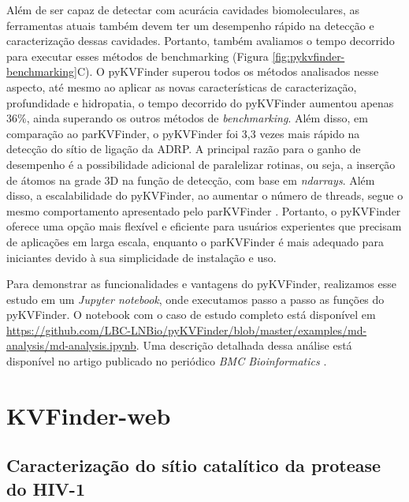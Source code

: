 \documentclass[Portugues]{phdquali}
\begin{document}
Além de ser capaz de detectar com acurácia cavidades biomoleculares, as ferramentas atuais também devem ter um desempenho rápido na detecção e caracterização dessas cavidades. Portanto, também avaliamos o tempo decorrido para executar esses métodos de benchmarking (Figura \ref{fig:pykvfinder-benchmarking}C). O pyKVFinder superou todos os métodos analisados nesse aspecto, até mesmo ao aplicar as novas características de caracterização, profundidade e hidropatia, o tempo decorrido do pyKVFinder aumentou apenas 36\%, ainda superando os outros métodos de \textit{benchmarking}. Além disso, em comparação ao parKVFinder, o pyKVFinder foi 3,3 vezes mais rápido na detecção do sítio de ligação da ADRP. A principal razão para o ganho de desempenho é a possibilidade adicional de paralelizar rotinas, ou seja, a inserção de átomos na grade 3D na função de detecção, com base em \textit{ndarrays}. Além disso, a escalabilidade do pyKVFinder, ao aumentar o número de threads, segue o mesmo comportamento apresentado pelo parKVFinder \cite{guerra2020}. Portanto, o pyKVFinder oferece uma opção mais flexível e eficiente para usuários experientes que precisam de aplicações em larga escala, enquanto o parKVFinder é mais adequado para iniciantes devido à sua simplicidade de instalação e uso.

Para demonstrar as funcionalidades e vantagens do pyKVFinder, realizamos esse estudo em um \textit{Jupyter notebook}, onde executamos passo a passo as funções do pyKVFinder. O notebook com o caso de estudo completo está disponível em \url{https://github.com/LBC-LNBio/pyKVFinder/blob/master/examples/md-analysis/md-analysis.ipynb}. Uma descrição detalhada dessa análise está disponível no artigo publicado no periódico \textit{BMC Bioinformatics} \cite{guerra2021}.

\section{KVFinder-web \label{ap:casos-de-estudo-kvfinder-web}}

\subsection{Caracterização do sítio catalítico da protease do HIV-1}
\end{document}
